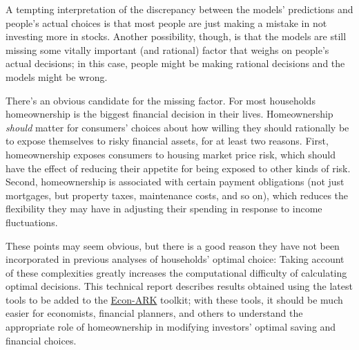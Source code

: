 
  A tempting interpretation of the discrepancy between the models' predictions and people's actual choices is that most people are just making a mistake in not investing more in stocks. Another possibility, though, is that the models are still missing some vitally important (and rational) factor that weighs on people's actual decisions; in this case, people might be making rational decisions and the models might be wrong.

  There's an obvious candidate for the missing factor.  For most households homeownership is the biggest financial decision in their lives.  Homeownership \textit{should} matter for consumers' choices about how willing they should rationally be to expose themselves to risky financial assets, for at least two reasons.  First, homeownership exposes consumers to housing market price risk, which should have the effect of reducing their appetite for being exposed to other kinds of risk.  Second, homeownership is associated with certain payment obligations (not just mortgages, but property taxes, maintenance costs, and so on), which reduces the flexibility they may have in adjusting their spending in response to income fluctuations.

  These points may seem obvious, but there is a good reason they have not been incorporated in previous analyses of households' optimal choice:  Taking account of these complexities greatly increases the computational difficulty of calculating  optimal decisions.  This technical report describes results obtained using the latest tools to be added to the \href{https://econ-ark.org/}{Econ-ARK} toolkit; with these tools, it should be much easier for economists, financial planners, and others to understand the appropriate role of homeownership in modifying investors' optimal saving and financial choices.

